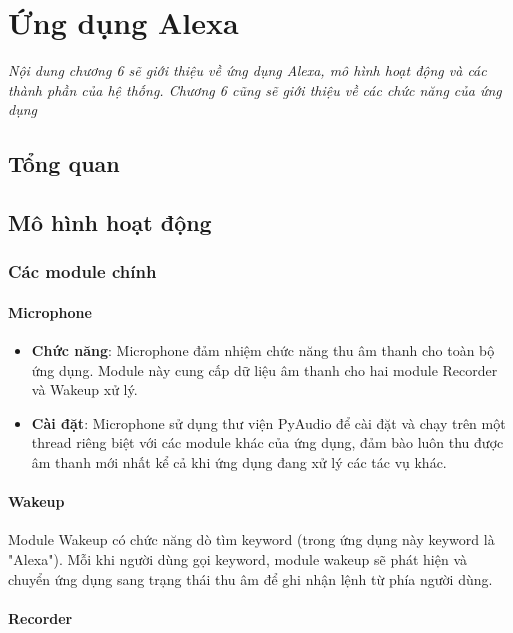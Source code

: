 \chapter{Ứng dụng Alexa}
\ifpdf
    \graphicspath{{Chapter6/Chapter6Figs/PNG/}{Chapter6/Chapter6Figs/PDF/}{Chapter6/Chapter6Figs/}}
\else
    \graphicspath{{Chapter6/Chapter6Figs/EPS/}{Chapter6/Chapter6Figs/}}
\fi

\textit{Nội dung chương 6 sẽ giới thiệu về ứng dụng Alexa, mô hình hoạt động và các thành phần của hệ thống. Chương 6 cũng sẽ giới thiệu về các chức năng của ứng dụng}

\section{Tổng quan}

\section{Mô hình hoạt động}
\subsection{Các module chính}
\subsubsection{Microphone}
\begin{itemize}
\item \textbf{Chức năng}: Microphone đảm nhiệm chức năng thu âm thanh cho toàn bộ ứng dụng. Module này cung cấp dữ liệu âm thanh cho hai module Recorder và Wakeup xử lý.
\item \textbf{Cài đặt}: Microphone sử dụng thư viện PyAudio để cài đặt và chạy trên một thread riêng biệt với các module khác của ứng dụng, đảm bào luôn thu được âm thanh mới nhất kể cả khi ứng dụng đang xử lý các tác vụ khác.
\end{itemize}
\subsubsection{Wakeup}
Module Wakeup có chức năng dò tìm keyword (trong ứng dụng này keyword là "Alexa"). Mỗi khi người dùng gọi keyword, module wakeup sẽ phát hiện và chuyển ứng dụng sang trạng thái thu âm để ghi nhận lệnh từ phía người dùng.

\subsubsection{Recorder}

